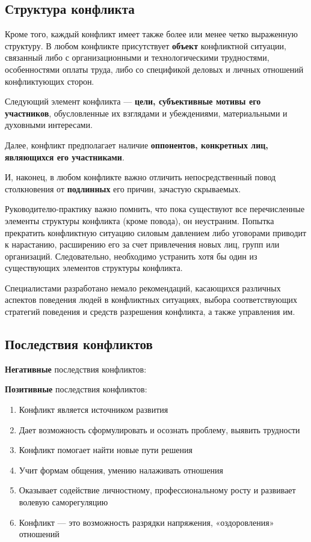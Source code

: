 \documentclass[a4paper,14pt]{extarticle}
\begin{document}
\subsection{Структура конфликта}

Кроме того, каждый конфликт имеет также более или менее четко выраженную структуру. В любом конфликте присутствует \textbf{объект} конфликтной ситуации, связанный либо с организационными и технологическими трудностями, особенностями оплаты труда, либо со спецификой деловых и личных отношений конфликтующих сторон.

Следующий элемент конфликта — \textbf{цели, субъективные мотивы его участников}, обусловленные их взглядами и убеждениями, материальными и духовными интересами.

Далее, конфликт предполагает наличие \textbf{оппонентов, конкретных лиц, являющихся его участниками}.

И, наконец, в любом конфликте важно отличить непосредственный повод столкновения от \textbf{подлинных} его причин, зачастую скрываемых.

\hfill

Руководителю-практику важно помнить, что пока существуют все перечисленные элементы структуры конфликта (кроме повода), он неустраним. Попытка прекратить конфликтную ситуацию силовым давлением либо уговорами приводит к нарастанию, расширению его за счет привлечения новых лиц, групп или организаций. Следовательно, необходимо устранить хотя бы один из существующих элементов структуры конфликта.

Специалистами разработано немало рекомендаций, касающихся различных аспектов поведения людей в конфликтных ситуациях, выбора соответствующих стратегий поведения и средств разрешения конфликта, а также управления им.

\subsection{Последствия конфликтов}

\textbf{Негативные} последствия конфликтов:

\begin{multienumerate}
\end{multienumerate}

\textbf{Позитивные} последствия конфликтов:

\begin{enumerate}
    \item Конфликт является источником развития
    \item Дает возможность сформулировать и осознать проблему, выявить трудности
    \item Конфликт помогает найти новые пути решения
    \item Учит формам общения, умению налаживать отношения
    \item Оказывает содействие личностному, профессиональному росту и развивает волевую саморегуляцию
    \item Конфликт — это возможность разрядки напряжения, «оздоровления» отношений
\end{enumerate}
\end{document}

